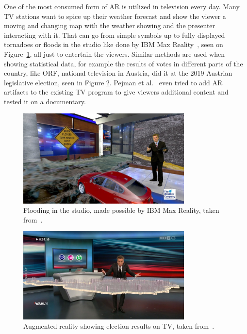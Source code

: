 \begin{description}
	One of the most consumed form of AR is utilized in television every day. Many TV stations want to spice up their weather forecast and show the viewer a moving and changing map with the weather showing and the presenter interacting with it. That can go from simple symbols up to fully displayed tornadoes or floods in the studio like done by IBM Max Reality~\cite{ibm}, seen on Figure~\ref{fig:ibm_mr},  all just to entertain the viewers. Similar methods are used when showing statistical data, for example the results of votes in different parts of the country, like ORF, national television in Austria, did it at the 2019 Austrian legislative election, seen in Figure \ref{fig:election}. 
	Pejman et al.~\cite{pejman19} even tried to add AR artifacts to the existing TV program to give viewers additional content and tested it on a documentary.
	
	
	
	\begin{figure}[!ht]
		\captionsetup{justification=centering}
		\centering
		\includegraphics[width=0.78\textwidth]{media/ibm_max_reality.jpg}
		\hfill
		\caption{Flooding in the studio, made possible by IBM Max Reality, taken from~\cite{ibm}.}
		\label{fig:ibm_mr}
	\end{figure}
	\begin{figure}[!ht]
		\captionsetup{justification=centering}
		\centering
		\includegraphics[width=0.78\textwidth]{media/election.jpg}
		\hfill
		\caption{Augmented reality showing election results on TV, taken from~\cite{fluch19}.}
		\label{fig:election}
	\end{figure}


\end{description}
